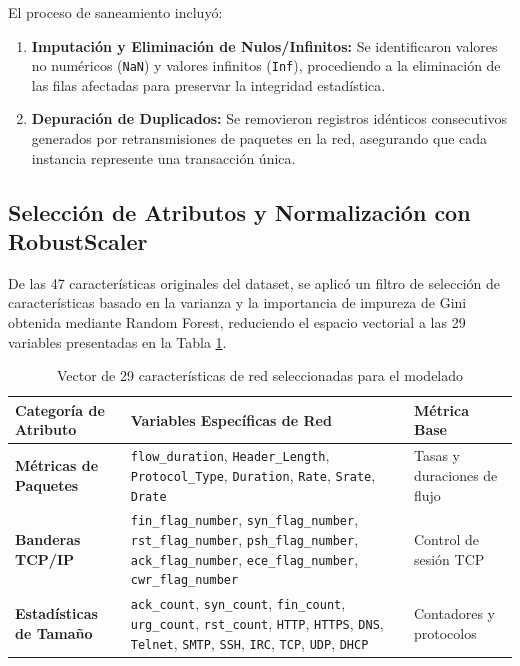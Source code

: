 El proceso de saneamiento incluyó:
\begin{enumerate}
    \item \textbf{Imputación y Eliminación de Nulos/Infinitos:} Se identificaron valores no numéricos (\texttt{NaN}) y valores infinitos (\texttt{Inf}), procediendo a la eliminación de las filas afectadas para preservar la integridad estadística.
    \item \textbf{Depuración de Duplicados:} Se removieron registros idénticos consecutivos generados por retransmisiones de paquetes en la red, asegurando que cada instancia represente una transacción única.
\end{enumerate}

\subsection{Selección de Atributos y Normalización con RobustScaler}
De las 47 características originales del dataset, se aplicó un filtro de selección de características basado en la varianza y la importancia de impureza de Gini obtenida mediante Random Forest, reduciendo el espacio vectorial a las 29 variables presentadas en la Tabla \ref{tab:variables_seleccionadas_mm2}.

\begin{table}[H]
\centering
\caption{Vector de 29 características de red seleccionadas para el modelado}
\label{tab:variables_seleccionadas_mm2}
\small



\begin{tabularx}{\textwidth}{p{4.5cm} X p{3.0cm}}
\toprule
\textbf{Categoría de Atributo} & \textbf{Variables Específicas de Red} & \textbf{Métrica Base} \\
\midrule
\textbf{Métricas de Paquetes} & \texttt{flow\_duration}, \texttt{Header\_Length}, \texttt{Protocol\_Type}, \texttt{Duration}, \texttt{Rate}, \texttt{Srate}, \texttt{Drate} & Tasas y duraciones de flujo \\
\textbf{Banderas TCP/IP} & \texttt{fin\_flag\_number}, \texttt{syn\_flag\_number}, \texttt{rst\_flag\_number}, \texttt{psh\_flag\_number}, \texttt{ack\_flag\_number}, \texttt{ece\_flag\_number}, \texttt{cwr\_flag\_number} & Control de sesión TCP \\
\textbf{Estadísticas de Tamaño} & \texttt{ack\_count}, \texttt{syn\_count}, \texttt{fin\_count}, \texttt{urg\_count}, \texttt{rst\_count}, \texttt{HTTP}, \texttt{HTTPS}, \texttt{DNS}, \texttt{Telnet}, \texttt{SMTP}, \texttt{SSH}, \texttt{IRC}, \texttt{TCP}, \texttt{UDP}, \texttt{DHCP} & Contadores y protocolos \\
\bottomrule
\end{tabularx}
\end{table}

